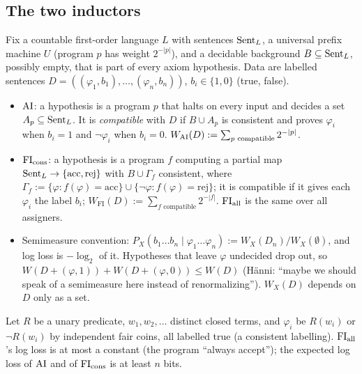 \subsection{The two inductors}\label{sec:time:inducers}

Fix a countable first-order language $L$ with sentences $\mathrm{Sent}_L$, a universal prefix machine $U$ (program $p$ has weight $2^{-|p|}$), and a decidable background $B\subseteq\mathrm{Sent}_L$, possibly empty, that is part of every axiom hypothesis. Data are labelled sentences $D=((\varphi_1,b_1),\dots,(\varphi_n,b_n))$, $b_i\in\{1,0\}$ (true, false).

\begin{definition}\label{def:time:inducers}
\begin{itemize}[leftmargin=*,itemsep=1pt]
\item $\mathrm{AI}$: a hypothesis is a program $p$ that halts on every input and decides a set $A_p\subseteq\mathrm{Sent}_L$. It is \emph{compatible} with $D$ if $B\cup A_p$ is consistent and proves $\varphi_i$ when $b_i=1$ and $\neg\varphi_i$ when $b_i=0$. $W_{\mathrm{AI}}(D):=\sum_{p\text{ compatible}}2^{-|p|}$.
\item $\mathrm{FI}_{\mathrm{cons}}$: a hypothesis is a program $f$ computing a partial map $\mathrm{Sent}_L\to\{\mathrm{acc},\mathrm{rej}\}$ with $B\cup\Gamma_f$ consistent, where $\Gamma_f:=\{\varphi:f(\varphi)=\mathrm{acc}\}\cup\{\neg\varphi:f(\varphi)=\mathrm{rej}\}$; it is compatible if it gives each $\varphi_i$ the label $b_i$; $W_{\mathrm{FI}}(D):=\sum_{f\text{ compatible}}2^{-|f|}$. $\mathrm{FI}_{\mathrm{all}}$ is the same over all assigners.
\item Semimeasure convention: $P_X(b_1\dots b_n\mid\varphi_1\dots\varphi_n):=W_X(D_n)/W_X(\emptyset)$, and log loss is $-\log_2$ of it. Hypotheses that leave $\varphi$ undecided drop out, so $W(D+(\varphi,1))+W(D+(\varphi,0))\le W(D)$ (H\"anni: ``maybe we should speak of a semimeasure here instead of renormalizing''). $W_X(D)$ depends on $D$ only as a set.
\end{itemize}
\end{definition}

\begin{proposition}\label{prop:time:fiall}
Let $R$ be a unary predicate, $w_1,w_2,\dots$ distinct closed terms, and $\varphi_i$ be $R(w_i)$ or $\neg R(w_i)$ by independent fair coins, all labelled true (a consistent labelling). $\mathrm{FI}_{\mathrm{all}}$'s log loss is at most a constant (the program ``always accept''); the expected log loss of $\mathrm{AI}$ and of $\mathrm{FI}_{\mathrm{cons}}$ is at least $n$ bits.
\end{proposition}


